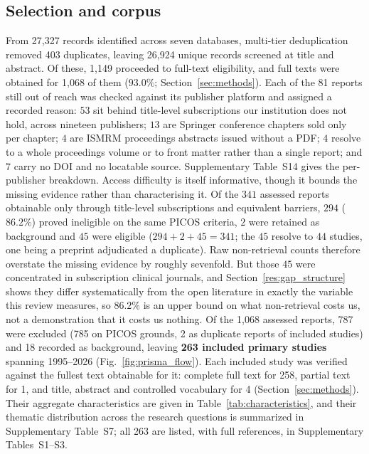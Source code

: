 \documentclass[review,authoryear]{elsarticle}
\begin{document}
\subsection{Selection and corpus}
From 27{,}327 records identified across seven databases, multi-tier deduplication
removed 403 duplicates, leaving 26{,}924 unique records screened at title and abstract.
Of these, 1{,}149 proceeded to full-text eligibility, and full texts were obtained
for 1{,}068 of them ($93.0\%$; Section~\ref{sec:methods}). Each of
the 81 reports
still out of reach was checked against its publisher platform and assigned a recorded
reason: $53$ sit behind title-level subscriptions our institution does not hold, across
nineteen publishers; $13$ are Springer conference chapters sold only per chapter; $4$ are
ISMRM proceedings abstracts issued without a PDF; $4$ resolve to a whole proceedings volume
or to front matter rather than a single report; and $7$ carry no DOI and no locatable
source. Supplementary Table~S14 gives the per-publisher breakdown.
Access difficulty is itself informative, though it bounds the missing evidence rather than
characterising it. Of the $341$ assessed reports obtainable only through title-level
subscriptions and equivalent barriers, $294$ ($86.2\%$) proved ineligible on the same PICOS
criteria, $2$ were retained as background and $45$ were eligible ($294+2+45=341$; the $45$
resolve to $44$ studies, one being a preprint adjudicated a duplicate). Raw non-retrieval
counts therefore overstate the missing evidence by roughly sevenfold. But those $45$ were
concentrated in subscription clinical journals, and Section~\ref{res:gap_structure} shows
they differ systematically from the open literature in exactly the variable this review
measures, so $86.2\%$ is an upper bound on what non-retrieval costs us, not a demonstration
that it costs us nothing. Of the 1{,}068 assessed reports, 787 were
excluded (785 on PICOS grounds, 2 as duplicate reports of included studies) and 18
recorded as background, leaving \textbf{263 included
primary studies} spanning 1995--2026 (Fig.~\ref{fig:prisma_flow}). Each included study
was verified against the fullest text obtainable for it: complete full text for 258,
partial text for 1, and title, abstract and controlled vocabulary for 4
(Section~\ref{sec:methods}). Their aggregate
characteristics are given in Table~\ref{tab:characteristics}, and their thematic distribution across the research questions is summarized in Supplementary Table~S7; all 263 are listed, with full references, in Supplementary Tables~S1--S3.
\end{document}
